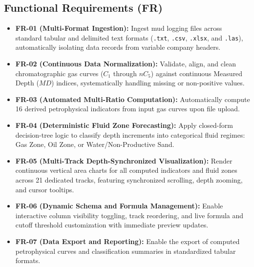 \subsection{Functional Requirements (FR)}
\begin{itemize}
    \item \textbf{FR-01 (Multi-Format Ingestion):} Ingest mud logging files across standard tabular and delimited text formats (\texttt{.txt}, \texttt{.csv}, \texttt{.xlsx}, and \texttt{.las}), automatically isolating data records from variable company headers.
    \item \textbf{FR-02 (Continuous Data Normalization):} Validate, align, and clean chromatographic gas curves ($C_1$ through $nC_5$) against continuous Measured Depth ($MD$) indices, systematically handling missing or non-positive values.
    \item \textbf{FR-03 (Automated Multi-Ratio Computation):} Automatically compute 16 derived petrophysical indicators from input gas curves upon file upload.
    \item \textbf{FR-04 (Deterministic Fluid Zone Forecasting):} Apply closed-form decision-tree logic to classify depth increments into categorical fluid regimes: Gas Zone, Oil Zone, or Water/Non-Productive Sand.
    \item \textbf{FR-05 (Multi-Track Depth-Synchronized Visualization):} Render continuous vertical area charts for all computed indicators and fluid zones across 21 dedicated tracks, featuring synchronized scrolling, depth zooming, and cursor tooltips.
    \item \textbf{FR-06 (Dynamic Schema and Formula Management):} Enable interactive column visibility toggling, track reordering, and live formula and cutoff threshold customization with immediate preview updates.
    \item \textbf{FR-07 (Data Export and Reporting):} Enable the export of computed petrophysical curves and classification summaries in standardized tabular formats.
\end{itemize}

